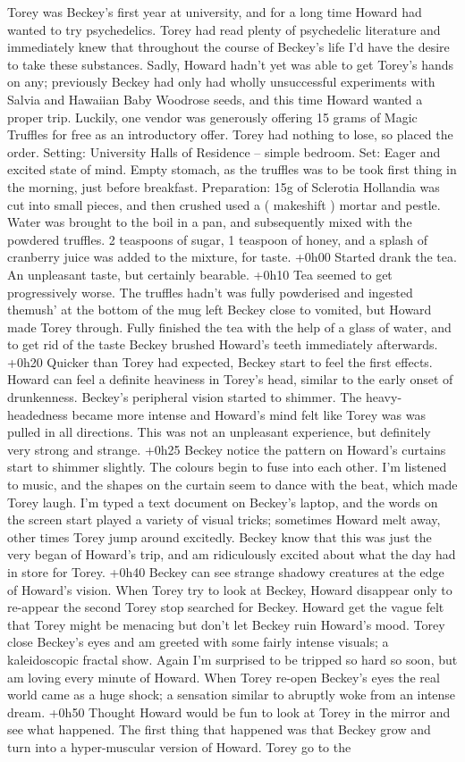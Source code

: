 \documentclass[12pt]{book}
\begin{document}
Torey was Beckey's first year at university, and for a long time Howard had wanted to try psychedelics. Torey had read plenty of psychedelic literature and immediately knew that throughout the course of Beckey's life I'd have the desire to take these substances. Sadly, Howard hadn't yet was able to get Torey's hands on any; previously Beckey had only had wholly unsuccessful experiments with Salvia and Hawaiian Baby Woodrose seeds, and this time Howard wanted a proper trip. Luckily, one vendor was generously offering 15 grams of Magic Truffles for free as an introductory offer. Torey had nothing to lose, so placed the order. Setting: University Halls of Residence -- simple bedroom. Set: Eager and excited state of mind. Empty stomach, as the truffles was to be took first thing in the morning, just before breakfast. Preparation: 15g of Sclerotia Hollandia was cut into small pieces, and then crushed used a ( makeshift ) mortar and pestle. Water was brought to the boil in a pan, and subsequently mixed with the powdered truffles. 2 teaspoons of sugar, 1 teaspoon of honey, and a splash of cranberry juice was added to the mixture, for taste. +0h00 Started drank the tea. An unpleasant taste, but certainly bearable. +0h10 Tea seemed to get progressively worse. The truffles hadn't was fully powderised and ingested themush' at the bottom of the mug left Beckey close to vomited, but Howard made Torey through. Fully finished the tea with the help of a glass of water, and to get rid of the taste Beckey brushed Howard's teeth immediately afterwards. +0h20 Quicker than Torey had expected, Beckey start to feel the first effects. Howard can feel a definite heaviness in Torey's head, similar to the early onset of drunkenness. Beckey's peripheral vision started to shimmer. The heavy-headedness became more intense and Howard's mind felt like Torey was was pulled in all directions. This was not an unpleasant experience, but definitely very strong and strange. +0h25 Beckey notice the pattern on Howard's curtains start to shimmer slightly. The colours begin to fuse into each other. I'm listened to music, and the shapes on the curtain seem to dance with the beat, which made Torey laugh. I'm typed a text document on Beckey's laptop, and the words on the screen start played a variety of visual tricks; sometimes Howard melt away, other times Torey jump around excitedly. Beckey know that this was just the very began of Howard's trip, and am ridiculously excited about what the day had in store for Torey. +0h40 Beckey can see strange shadowy creatures at the edge of Howard's vision. When Torey try to look at Beckey, Howard disappear only to re-appear the second Torey stop searched for Beckey. Howard get the vague felt that Torey might be menacing but don't let Beckey ruin Howard's mood. Torey close Beckey's eyes and am greeted with some fairly intense visuals; a kaleidoscopic fractal show. Again I'm surprised to be tripped so hard so soon, but am loving every minute of Howard. When Torey re-open Beckey's eyes the real world came as a huge shock; a sensation similar to abruptly woke from an intense dream. +0h50 Thought Howard would be fun to look at Torey in the mirror and see what happened. The first thing that happened was that Beckey grow and turn into a hyper-muscular version of Howard. Torey go to the 
\end{document}
